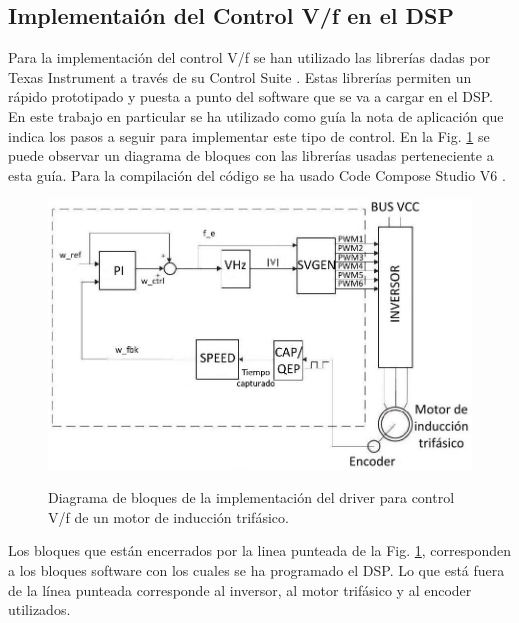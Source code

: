 \documentclass[conference]{IEEEtran}
\begin{document}
\subsection{Implementaión del Control V/f en el DSP}

Para la implementación del control V/f se han utilizado las librerías dadas por Texas Instrument a través de su Control Suite \cite{ControlSuite}. Estas librerías permiten un rápido prototipado y puesta a punto del software que se va a cargar en el DSP. En este trabajo en particular se ha utilizado como guía la nota de aplicación \cite{ti} que indica los pasos a seguir para implementar este tipo de control. En la Fig. \ref{fig_bloques} se puede observar un diagrama de bloques con las librerías usadas perteneciente a esta guía. Para la compilación del código se ha usado Code Compose Studio V6 \cite{CCS}.

\begin{figure}[!t]
\centering
\includegraphics[width=8 cm]{figuras/figura_06.jpeg}\\
\caption{Diagrama de bloques de la implementación del driver para control V/f de un motor de inducción trifásico.} 
\label{fig_bloques}
\end{figure}

Los bloques que están encerrados por la linea punteada de la Fig. \ref{fig_bloques}, corresponden a los bloques software con los cuales se ha programado el DSP. Lo que está fuera de la línea punteada corresponde al inversor, al motor trifásico y al encoder utilizados.
\end{document}
